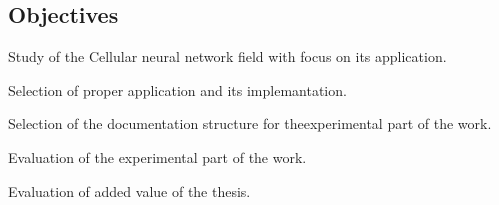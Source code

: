 \subsection{Objectives}
\begin{list}{•}{}
\item Study of the Cellular neural network field with focus on its application.
\item Selection of proper application and its implemantation.
\item Selection of the documentation structure for theexperimental part of the work.
\item Evaluation of the experimental part of the work.
\item Evaluation of added value of the thesis.
\end{list}